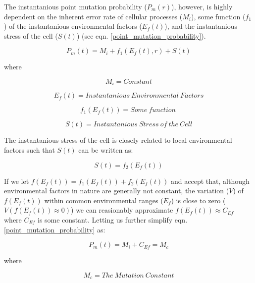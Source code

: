 \documentclass{article}
\begin{document}
    The instantanious point mutation probability (\(P_m(r)\)), however, is highly dependent on the inherent error rate of cellular processes (\(M_i\)), some function (\(f_1\)) of the instantanious environmental factors (\(E_f(t)\)), and the instantanious stress of the cell (\(S(t)\)) (see eqn. \ref{point_mutation_probability}).
    
    \begin{equation}
        P_m(t) = M_i + f_1(E_f(t), r) + S(t) \label{point_mutation_probability}
    \end{equation}

    where

    \begin{equation}
        M_i = Constant
    \end{equation}

    \begin{equation}
        E_f(t) = Instantanious\ Environmental\ Factors    
    \end{equation}
    

    \begin{equation}
        f_1(E_f(t)) = Some\ function\
    \end{equation}
    
    \begin{equation}
        S(t) = Instantanious\ Stress\ of\ the\ Cell
    \end{equation}


    The instantanious stress of the cell is closely related to local environmental factors such that \(S(t)\) can be written as:

    \begin{equation}
        S(t) = f_2(E_f(t))
    \end{equation}

    If we let \(f(E_f(t)) = f_1(E_f(t)) + f_2(E_f(t))\) and accept that, although environmental factors in nature are generally not constant, the variation (\(V\)) of \(f(E_f(t))\) within common environmental ranges (\(E_f\)) is close to zero (\(V(f(E_f(t)) \approx 0)\)) we can reasionably approximate \(f(E_f(t)) \approx C_{Ef} \) where \(C_{Ef}\) is some constant. Letting us further simplify eqn. \ref{point_mutation_probability} as:
    

    \begin{equation}
        P_m(t) = M_i + C_{Ef} = M_c
    \end{equation}

    where

    \begin{equation}
        M_c = The\ Mutation\ Constant
    \end{equation}
\end{document}
